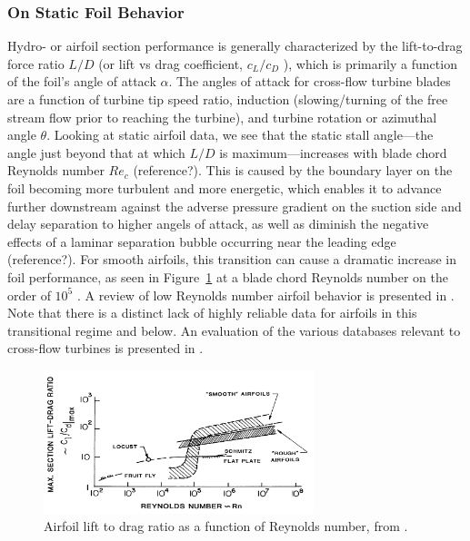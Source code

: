 \documentclass[energies,article,accept,moreauthors,pdftex,12pt,a4paper]{mdpi}
\begin{document}
\subsubsection{On Static Foil Behavior}

Hydro- or airfoil section performance is generally characterized by the
lift-to-drag
force ratio $L/D$  (or lift vs drag coefficient, $c_L/c_D$ ),
which is primarily a function of the foil's angle of attack $\alpha$. The
angles of attack
for cross-flow turbine blades are a function of turbine tip speed ratio,
induction (slowing/turning of the free stream flow prior to reaching the
turbine), and turbine rotation or azimuthal angle $\theta$. Looking at static
airfoil data, we see that the static stall angle---the angle just beyond that at
which $L/D$ is maximum---increases with blade chord Reynolds number $Re_c$
(reference?). This
is caused by the boundary layer on the foil becoming more turbulent and more
energetic, which enables it to advance further downstream against the adverse
pressure gradient on the suction side and delay separation to higher angels of
attack, as well as diminish the negative effects of a laminar separation
bubble occurring near the leading edge (reference?). For smooth airfoils, this
transition can
cause a dramatic increase in foil performance, as seen in
Figure~\ref{fig:McMasters} at a blade chord Reynolds number on the order of
$10^5$ \cite{McMasters1980}. A review of low Reynolds number airfoil behavior is
presented in \cite{Lissaman1983}. Note that there is a distinct lack of highly
reliable data for airfoils in this transitional regime and below. An evaluation
of the various databases relevant to cross-flow turbines is presented in
\cite{Bedon2014}.


\begin{figure}[ht]
\centering
\includegraphics[width=0.7\textwidth]{figures/McMasters-Henderson-1980}
\caption{Airfoil lift to drag ratio as a function of Reynolds number, from
\cite{McMasters1980}.}
\label{fig:McMasters}
\end{figure}
\end{document}
